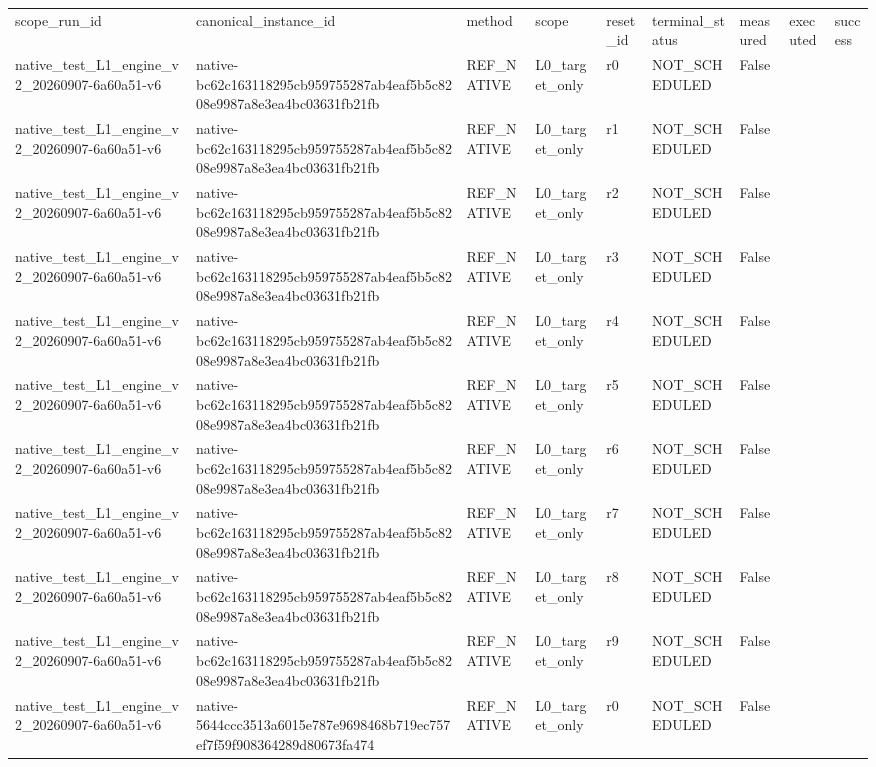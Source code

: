 \begin{tabular}{lllllllll}
scope\_run\_id & canonical\_instance\_id & method & scope & reset\_id & terminal\_status & measured & executed & success \\
native\_test\_L1\_engine\_v2\_20260907-6a60a51-v6 & native-bc62c163118295cb959755287ab4eaf5b5c8208e9987a8e3ea4bc03631fb21fb & REF\_NATIVE & L0\_target\_only & r0 & NOT\_SCHEDULED & False &  &  \\
native\_test\_L1\_engine\_v2\_20260907-6a60a51-v6 & native-bc62c163118295cb959755287ab4eaf5b5c8208e9987a8e3ea4bc03631fb21fb & REF\_NATIVE & L0\_target\_only & r1 & NOT\_SCHEDULED & False &  &  \\
native\_test\_L1\_engine\_v2\_20260907-6a60a51-v6 & native-bc62c163118295cb959755287ab4eaf5b5c8208e9987a8e3ea4bc03631fb21fb & REF\_NATIVE & L0\_target\_only & r2 & NOT\_SCHEDULED & False &  &  \\
native\_test\_L1\_engine\_v2\_20260907-6a60a51-v6 & native-bc62c163118295cb959755287ab4eaf5b5c8208e9987a8e3ea4bc03631fb21fb & REF\_NATIVE & L0\_target\_only & r3 & NOT\_SCHEDULED & False &  &  \\
native\_test\_L1\_engine\_v2\_20260907-6a60a51-v6 & native-bc62c163118295cb959755287ab4eaf5b5c8208e9987a8e3ea4bc03631fb21fb & REF\_NATIVE & L0\_target\_only & r4 & NOT\_SCHEDULED & False &  &  \\
native\_test\_L1\_engine\_v2\_20260907-6a60a51-v6 & native-bc62c163118295cb959755287ab4eaf5b5c8208e9987a8e3ea4bc03631fb21fb & REF\_NATIVE & L0\_target\_only & r5 & NOT\_SCHEDULED & False &  &  \\
native\_test\_L1\_engine\_v2\_20260907-6a60a51-v6 & native-bc62c163118295cb959755287ab4eaf5b5c8208e9987a8e3ea4bc03631fb21fb & REF\_NATIVE & L0\_target\_only & r6 & NOT\_SCHEDULED & False &  &  \\
native\_test\_L1\_engine\_v2\_20260907-6a60a51-v6 & native-bc62c163118295cb959755287ab4eaf5b5c8208e9987a8e3ea4bc03631fb21fb & REF\_NATIVE & L0\_target\_only & r7 & NOT\_SCHEDULED & False &  &  \\
native\_test\_L1\_engine\_v2\_20260907-6a60a51-v6 & native-bc62c163118295cb959755287ab4eaf5b5c8208e9987a8e3ea4bc03631fb21fb & REF\_NATIVE & L0\_target\_only & r8 & NOT\_SCHEDULED & False &  &  \\
native\_test\_L1\_engine\_v2\_20260907-6a60a51-v6 & native-bc62c163118295cb959755287ab4eaf5b5c8208e9987a8e3ea4bc03631fb21fb & REF\_NATIVE & L0\_target\_only & r9 & NOT\_SCHEDULED & False &  &  \\
native\_test\_L1\_engine\_v2\_20260907-6a60a51-v6 & native-5644ccc3513a6015e787e9698468b719ec757ef7f59f908364289d80673fa474 & REF\_NATIVE & L0\_target\_only & r0 & NOT\_SCHEDULED & False &  &  \\

\end{tabular}

